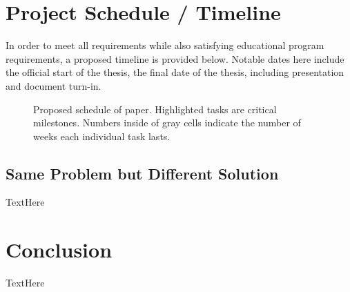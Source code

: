 \section{Project Schedule / Timeline}
In order to meet all requirements while also satisfying educational program requirements, a proposed timeline is provided below. Notable dates here include the official start of the thesis, the final date of the thesis, including presentation and document turn-in.

\begin{figure}[h] %
    \caption{Proposed schedule of paper. Highlighted tasks are critical milestones. Numbers inside of gray cells indicate the number of weeks each individual task lasts.}
\end{figure}


\subsection{Same Problem but Different Solution}
TextHere

\section{Conclusion}
TextHere
